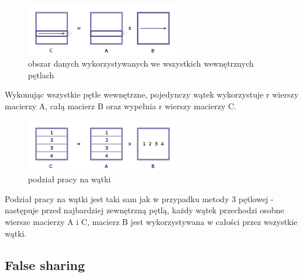 \documentclass[12pt,a4paper]{article}
\begin{document}
\begin{figure}[H]
  \centering
    \includegraphics[width=0.60\textwidth]{IJKIJK_KKJJIIKJ.jpg}
    \caption{obszar danych wykorzystywanych we wszystkich wewnętrznych pętlach}
\end{figure}

Wykonując wszystkie pętle wewnętrzne, pojedynczy wątek wykorzystuje r wierszy macierzy A, całą macierz B oraz wypełnia r wierszy macierzy C.

\begin{figure}[H]
  \centering
    \includegraphics[width=0.60\textwidth]{IJK_KJI.jpg}
    \caption{podział pracy na wątki}
\end{figure}

Podział pracy na wątki jest taki sam jak w przypadku metody 3 pętlowej -  następuje przed najbardziej zewnętrzną pętlą, każdy wątek przechodzi osobne wiersze macierzy A i C, macierz B jest wykorzystywana w całości przez wszystkie wątki.


\subsection{False sharing}
\end{document}
